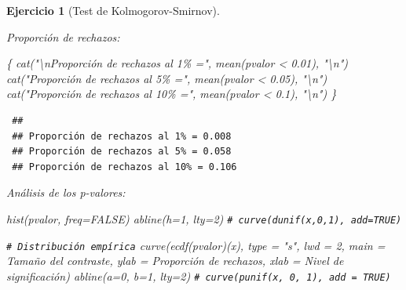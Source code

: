 \documentclass[
  10pt,
]{book}
\newenvironment{Shaded}{\begin{snugshade}}{\end{snugshade}}
\newcommand{\AttributeTok}[1]{\textcolor[rgb]{0.77,0.63,0.00}{#1}}
\newcommand{\CommentTok}[1]{\textcolor[rgb]{0.56,0.35,0.01}{\textit{#1}}}
\newcommand{\ConstantTok}[1]{\textcolor[rgb]{0.00,0.00,0.00}{#1}}
\newcommand{\DecValTok}[1]{\textcolor[rgb]{0.00,0.00,0.81}{#1}}
\newcommand{\FloatTok}[1]{\textcolor[rgb]{0.00,0.00,0.81}{#1}}
\newcommand{\FunctionTok}[1]{\textcolor[rgb]{0.00,0.00,0.00}{#1}}
\newcommand{\NormalTok}[1]{#1}
\newcommand{\SpecialCharTok}[1]{\textcolor[rgb]{0.00,0.00,0.00}{#1}}
\newcommand{\StringTok}[1]{\textcolor[rgb]{0.31,0.60,0.02}{#1}}
\theoremstyle{break}
\newtheorem{exercise}{Ejercicio}[chapter]
\theoremstyle{nonumberplain}
\renewcommand{\CommentTok}[1]{\textcolor[rgb]{0.41,0.41,0.41}{\texttt{#1}}}
\begin{document}
\begin{exercise}[Test de Kolmogorov-Smirnov]
\begin{enumerate}
  Proporción de rechazos:

\begin{Shaded}
\begin{Highlighting}[]
\NormalTok{\{}
  \FunctionTok{cat}\NormalTok{(}\StringTok{"}\SpecialCharTok{\textbackslash{}n}\StringTok{Proporción de rechazos al 1\% ="}\NormalTok{, }\FunctionTok{mean}\NormalTok{(pvalor }\SpecialCharTok{\textless{}} \FloatTok{0.01}\NormalTok{), }\StringTok{"}\SpecialCharTok{\textbackslash{}n}\StringTok{"}\NormalTok{)}
  \FunctionTok{cat}\NormalTok{(}\StringTok{"Proporción de rechazos al 5\% ="}\NormalTok{, }\FunctionTok{mean}\NormalTok{(pvalor }\SpecialCharTok{\textless{}} \FloatTok{0.05}\NormalTok{), }\StringTok{"}\SpecialCharTok{\textbackslash{}n}\StringTok{"}\NormalTok{)}
  \FunctionTok{cat}\NormalTok{(}\StringTok{"Proporción de rechazos al 10\% ="}\NormalTok{, }\FunctionTok{mean}\NormalTok{(pvalor }\SpecialCharTok{\textless{}} \FloatTok{0.1}\NormalTok{), }\StringTok{"}\SpecialCharTok{\textbackslash{}n}\StringTok{"}\NormalTok{)}
\NormalTok{\}}
\end{Highlighting}
\end{Shaded}

\begin{verbatim}
 ## 
 ## Proporción de rechazos al 1% = 0.008 
 ## Proporción de rechazos al 5% = 0.058 
 ## Proporción de rechazos al 10% = 0.106
\end{verbatim}

  Análisis de los p-valores:

\begin{Shaded}
\begin{Highlighting}[]
\FunctionTok{hist}\NormalTok{(pvalor, }\AttributeTok{freq=}\ConstantTok{FALSE}\NormalTok{)}
\FunctionTok{abline}\NormalTok{(}\AttributeTok{h=}\DecValTok{1}\NormalTok{, }\AttributeTok{lty=}\DecValTok{2}\NormalTok{)   }\CommentTok{\# curve(dunif(x,0,1), add=TRUE)}

\CommentTok{\# Distribución empírica}
\FunctionTok{curve}\NormalTok{(}\FunctionTok{ecdf}\NormalTok{(pvalor)(x), }\AttributeTok{type =} \StringTok{"s"}\NormalTok{, }\AttributeTok{lwd =} \DecValTok{2}\NormalTok{, }
      \AttributeTok{main =} \StringTok{\textquotesingle{}Tamaño del contraste\textquotesingle{}}\NormalTok{, }\AttributeTok{ylab =} \StringTok{\textquotesingle{}Proporción de rechazos\textquotesingle{}}\NormalTok{, }
      \AttributeTok{xlab =} \StringTok{\textquotesingle{}Nivel de significación\textquotesingle{}}\NormalTok{)}
\FunctionTok{abline}\NormalTok{(}\AttributeTok{a=}\DecValTok{0}\NormalTok{, }\AttributeTok{b=}\DecValTok{1}\NormalTok{, }\AttributeTok{lty=}\DecValTok{2}\NormalTok{)   }\CommentTok{\# curve(punif(x, 0, 1), add = TRUE) }
\end{Highlighting}
\end{Shaded}


\end{enumerate}
\end{exercise}
\end{document}
